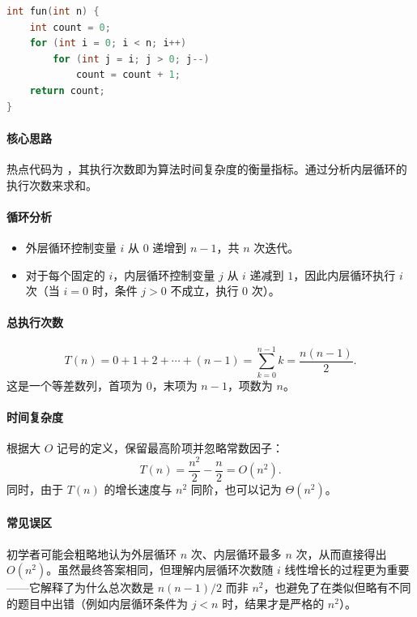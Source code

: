 \documentclass[b5paper,11pt]{article}
\begin{document}
\begin{lstlisting}[language=C]
int fun(int n) {
    int count = 0;
    for (int i = 0; i < n; i++)
        for (int j = i; j > 0; j--)
            count = count + 1;
    return count;
}
\end{lstlisting}

\paragraph{核心思路} 热点代码为 ，其执行次数即为算法时间复杂度的衡量指标。通过分析内层循环的执行次数来求和。

\paragraph{循环分析}
\begin{itemize}
  \item 外层循环控制变量 \(i\) 从 \(0\) 递增到 \(n-1\)，共 \(n\) 次迭代。
  \item 对于每个固定的 \(i\)，内层循环控制变量 \(j\) 从 \(i\) 递减到 \(1\)，因此内层循环执行 \(i\) 次（当 \(i=0\) 时，条件 \(j>0\) 不成立，执行 \(0\) 次）。
\end{itemize}

\paragraph{总执行次数}
\[
  T(n) = 0 + 1 + 2 + \cdots + (n-1) = \sum_{k=0}^{n-1} k = \frac{n(n-1)}{2}.
\]
这是一个等差数列，首项为 \(0\)，末项为 \(n-1\)，项数为 \(n\)。

\paragraph{时间复杂度} 根据大 \(O\) 记号的定义，保留最高阶项并忽略常数因子：
\[
  T(n) = \frac{n^2}{2} - \frac{n}{2} = O(n^2).
\]
同时，由于 \(T(n)\) 的增长速度与 \(n^2\) 同阶，也可以记为 \(\Theta(n^2)\)。

\paragraph{常见误区} 初学者可能会粗略地认为外层循环 \(n\) 次、内层循环最多 \(n\) 次，从而直接得出 \(O(n^2)\)。虽然最终答案相同，但理解内层循环次数随 \(i\) 线性增长的过程更为重要——它解释了为什么总次数是 \(n(n-1)/2\) 而非 \(n^2\)，也避免了在类似但略有不同的题目中出错（例如内层循环条件为 \(j < n\) 时，结果才是严格的 \(n^2\)）。
\end{document}
